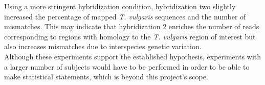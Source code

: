 Using a more stringent hybridization condition, hybridization two slightly increased the percentage of mapped \textit{T. vulgaris} sequences and the number of mismatches. This may indicate that hybridization 2 enriches the number of reads corresponding to regions with homology to the \textit{T. vulgaris} region of interest but also increases mismatches due to interspecies genetic variation.\\

Although these experiments support the established hypothesis, experiments with a larger number of subjects would have to be performed in order to be able to make statistical statements, which is beyond this project's scope.\\
